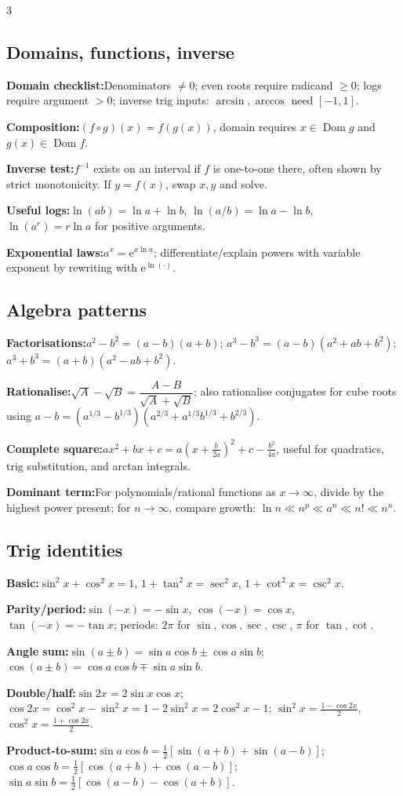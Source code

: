 \documentclass[10pt]{article}
\newcommand{\e}{\mathrm e}
\newcommand{\dom}{\operatorname{Dom}}
\newenvironment{cheatitems}{\par\vspace{-2pt}}{\par\vspace{-2pt}}
\newcommand{\cheatrow}[2]{%
  \par\noindent\textbf{#1:}\nobreak\hspace{0.25em}#2\par
}
\begin{document}
\begin{multicols}{3}
\footnotesize
\raggedright
\raggedcolumns
\abovedisplayskip=0pt \belowdisplayskip=0pt \abovedisplayshortskip=0pt \belowdisplayshortskip=0pt



\subsection*{Domains, functions, inverse}
\begin{cheatitems}
\cheatrow{Domain checklist}{Denominators $\ne0$; even roots require radicand $\ge0$; logs require argument $>0$; inverse trig inputs: $\arcsin,\arccos$ need $[-1,1]$.}
\cheatrow{Composition}{$(f\circ g)(x)=f(g(x))$, domain requires $x\in\dom g$ and $g(x)\in\dom f$.}
\cheatrow{Inverse test}{$f^{-1}$ exists on an interval if $f$ is one-to-one there, often shown by strict monotonicity. If $y=f(x)$, swap $x,y$ and solve.}
\cheatrow{Useful logs}{$\ln(ab)=\ln a+\ln b$, $\ln(a/b)=\ln a-\ln b$, $\ln(a^r)=r\ln a$ for positive arguments.}
\cheatrow{Exponential laws}{$a^x=\e^{x\ln a}$; differentiate/explain powers with variable exponent by rewriting with $\e^{\ln(\cdot)}$.}
\end{cheatitems}

\subsection*{Algebra patterns}
\begin{cheatitems}
\cheatrow{Factorisations}{$a^2-b^2=(a-b)(a+b)$; $a^3-b^3=(a-b)(a^2+ab+b^2)$; $a^3+b^3=(a+b)(a^2-ab+b^2)$.}
\cheatrow{Rationalise}{$\sqrt A-\sqrt B=\dfrac{A-B}{\sqrt A+\sqrt B}$; also rationalise conjugates for cube roots using $a-b=(a^{1/3}-b^{1/3})(a^{2/3}+a^{1/3}b^{1/3}+b^{2/3})$.}
\cheatrow{Complete square}{$ax^2+bx+c=a\left(x+\frac{b}{2a}\right)^2+c-\frac{b^2}{4a}$, useful for quadratics, trig substitution, and arctan integrals.}
\cheatrow{Dominant term}{For polynomials/rational functions as $x\to\infty$, divide by the highest power present; for $n\to\infty$, compare growth: $\ln n\ll n^p\ll a^n\ll n!\ll n^n$.}
\end{cheatitems}

\subsection*{Trig identities}
\begin{cheatitems}
\cheatrow{Basic}{$\sin^2x+\cos^2x=1$, $1+\tan^2x=\sec^2x$, $1+\cot^2x=\csc^2x$.}
\cheatrow{Parity/period}{$\sin(-x)=-\sin x$, $\cos(-x)=\cos x$, $\tan(-x)=-\tan x$; periods: $2\pi$ for $\sin,\cos,\sec,\csc$, $\pi$ for $\tan,\cot$.}
\cheatrow{Angle sum}{$\sin(a\pm b)=\sin a\cos b\pm\cos a\sin b$; $\cos(a\pm b)=\cos a\cos b\mp\sin a\sin b$.}
\cheatrow{Double/half}{$\sin2x=2\sin x\cos x$; $\cos2x=\cos^2x-\sin^2x=1-2\sin^2x=2\cos^2x-1$; $\sin^2x=\frac{1-\cos2x}{2}$, $\cos^2x=\frac{1+\cos2x}{2}$.}
\cheatrow{Product-to-sum}{$\sin a\cos b=\frac12[\sin(a+b)+\sin(a-b)]$; $\cos a\cos b=\frac12[\cos(a+b)+\cos(a-b)]$; $\sin a\sin b=\frac12[\cos(a-b)-\cos(a+b)]$.}
\end{cheatitems}


\end{multicols}
\end{document}
